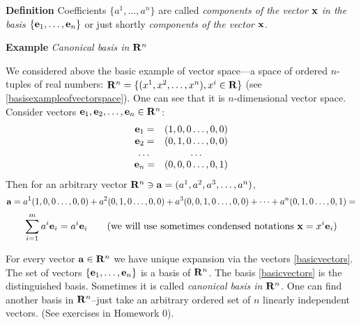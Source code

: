 \documentclass[12pt]{article}
\numberwithin{equation}{section}
\begin{document}
\m

 {\bf Definition}
 Coefficients $\{a^1,\dots,a^n\}$ are called 
{\it components of the vector ${\bf x}$ in the 
basis $\{{\bf e}_1,\dots,{\bf e}_n\}$}
 or just shortly {\it components of the vector ${\bf x}$}.

 \m



{\bf Example} {\it Canonical basis  in ${\bf R}^n$}

\m


We considered above  the basic example of 
vector space---a space
of ordered $n$-tuples of real numbers: 
${\bf R}^n=\{(x^1,x^2,\dots,x^n),  x^i\in {\bf R}\}$
(see \eqref{basisexampleofvectorspace}).
 One can see that it is $n$-dimensional vector space.
Consider vectors ${\bf e}_1,{\bf e}_2,\dots,{\bf e}_n\in {\bf R}^n$:
                  \begin{equation}\label{basicvectors}
                  \begin{array}{cc}
                    {\bf e}_1=& (1,0,0\dots,0,0) \\
                    {\bf e}_2=& (0,1,0\dots,0,0) \\
                    \dots & \dots \\
                    {\bf e}_n=& (0,0,0\dots,0,1) \\
                  \end{array}
                  \end{equation}
Then for an arbitrary vector   
${\bf R}^n\ni {\bf a}=(a^1,a^2,a^3,\dots,a^n)$,
                      $$
               {\bf a}=
    a^1(1,0,0\dots,0,0)+a^2(0,1,0\dots,0,0)+
            a^3(0,0,1,0\dots,0,0)+\dots+a^n(0,1,0\dots,0,1)=
                         $$
                         $$
 \sum_{i=1}^m a^i{\bf e}_i=a^i{\bf e}_i \qquad \hbox{(we will use sometimes condensed notations}\,\, {\bf x}= x^i{\bf e}_i)
                            $$


For every vector ${\bf a}\in {\bf R}^n$ we have 
unique expansion via the vectors
 \eqref{basicvectors}.
The set of vectors $\{{\bf e}_1,\dots,{\bf e}_n\}$ 
is a basis of ${\bf R}^n$.
 The basis \eqref{basicvectors} is the distinguished basis. 
Sometimes it is called {\it canonical basis in ${\bf R}^n$.}
One can find
  another basis in ${\bf R}^n$--just take an arbitrary 
ordered set of $n$  linearly independent vectors.
 (See exercises in  Homework 0).




\end{document}
